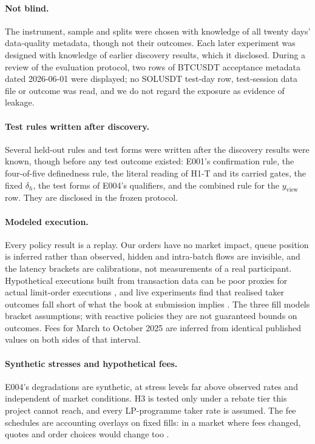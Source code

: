 \documentclass[11pt]{article}
\begin{document}
\paragraph{Not blind.} The instrument, sample and splits were chosen with knowledge of all twenty days' data-quality
metadata, though not their outcomes. Each later experiment was designed with knowledge of earlier discovery results, which
it disclosed. During a review of the evaluation protocol, two rows of BTCUSDT acceptance metadata dated 2026-06-01
were displayed; no SOLUSDT test-day row, test-session data file or outcome was read, and we do not regard the exposure as
evidence of leakage.

\paragraph{Test rules written after discovery.} Several held-out rules and test forms were written after the discovery
results were known, though before any test outcome existed: E001's confirmation rule, the four-of-five definedness rule,
the literal reading of H1-T and its carried gates, the fixed $\delta_h$, the test forms of E004's qualifiers, and the
combined rule for the $y_\mathrm{view}$ row. They are disclosed in the frozen protocol.

\paragraph{Modeled execution.} Every policy result is a replay. Our orders have no market impact, queue position is
inferred rather than observed, hidden and intra-batch flows are invisible, and the latency brackets are calibrations, not
measurements of a real participant. Hypothetical executions built from transaction data can be poor proxies for actual
limit-order executions \citep{lo2002}, and live experiments find that realised taker outcomes fall short of what the book at
submission implies \citep{albers2025latency}. The three fill models bracket assumptions; with reactive policies they are not
guaranteed bounds on outcomes. Fees for March to October 2025 are inferred from identical published values on both sides
of that interval.

\paragraph{Synthetic stresses and hypothetical fees.} E004's degradations are synthetic, at stress levels far above
observed rates and independent of market conditions. H3 is tested only under a rebate tier this project cannot reach,
and every LP-programme taker rate is assumed. The fee schedules are accounting overlays on fixed fills: in a market where
fees changed, quotes and order choices would change too \citep{malinova2015}.
\end{document}
